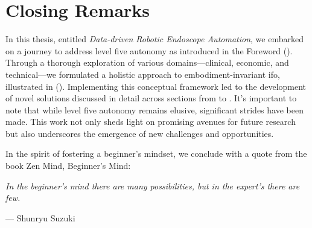 \section{Closing Remarks}

In this thesis, entitled \textit{Data-driven Robotic Endoscope Automation}, we embarked on a journey to address level five autonomy as introduced in the Foreword (). Through a thorough exploration of various domains—clinical, economic, and technical—we formulated a holistic approach to embodiment-invariant \gls{ifo}, illustrated in  (). Implementing this conceptual framework led to the development of novel solutions discussed in detail across sections from  to . It's important to note that while level five autonomy remains elusive, significant strides have been made. This work not only sheds light on promising avenues for future research but also underscores the emergence of new challenges and opportunities.

In the spirit of fostering a beginner's mindset, we conclude with a quote from the book Zen Mind, Beginner's Mind:


\vspace*{\fill}
\begin{center}
\textit{In the beginner’s mind there are many possibilities, but in the expert’s there are few.}

\vspace{5mm}
\hspace{20mm} --- Shunryu Suzuki~\cite{beginnersmind}
\end{center}

